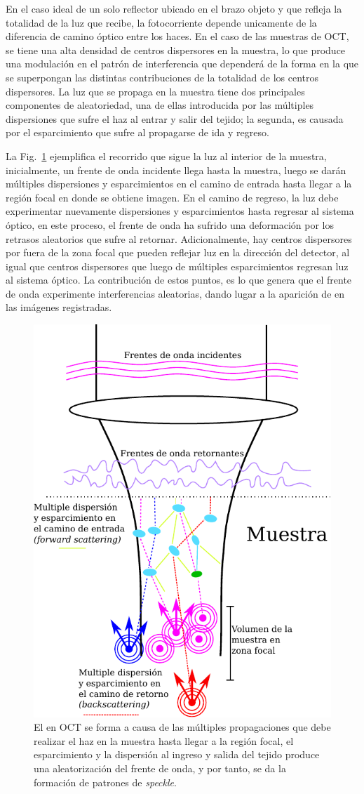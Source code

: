 En el caso ideal de un solo reflector ubicado en el brazo objeto y que refleja la totalidad de la luz que recibe, la fotocorriente depende unicamente de la diferencia de camino óptico entre los haces. En el caso de las muestras de OCT, se tiene una alta densidad de centros dispersores en la muestra, lo que produce una modulación en el patrón de interferencia que dependerá de la forma en la que se superpongan las distintas contribuciones de la totalidad de los centros dispersores. La luz que se propaga en la muestra tiene dos principales componentes de aleatoriedad, una de ellas introducida por las múltiples dispersiones que sufre el haz al entrar y salir del tejido; la segunda, es causada por el esparcimiento que sufre al propagarse de ida y regreso. 

La Fig.~\ref{fig:sample_backscattering} ejemplifica el recorrido que sigue la luz al interior de la muestra, inicialmente, un frente de onda incidente llega hasta la muestra, luego se darán múltiples dispersiones y esparcimientos en el camino de entrada hasta llegar a la región focal en donde se obtiene imagen. En el camino de regreso, la luz debe experimentar nuevamente dispersiones y esparcimientos hasta regresar al sistema óptico, en este proceso, el frente de onda ha sufrido una deformación por los retrasos aleatorios que sufre al retornar. Adicionalmente, hay centros dispersores por fuera de la zona focal que pueden reflejar luz en la dirección del detector, al igual que centros dispersores que luego de múltiples esparcimientos regresan luz al sistema óptico. La contribución de estos puntos, es lo que genera que el frente de onda experimente interferencias aleatorias, dando lugar a la aparición de \speckle en las imágenes registradas.

\begin{figure}
\centering
\includegraphics[width=0.4\linewidth]{img/chap3/sample_backscattering}
\caption[Formación del \speckle en OCT.]{El \speckle en OCT se forma a causa de las múltiples propagaciones que debe realizar el haz en la muestra hasta llegar a la región focal, el esparcimiento y la dispersión al ingreso y salida del tejido produce una aleatorización del frente de onda, y por tanto, se da la formación de patrones de \textit{speckle}.}
\label{fig:sample_backscattering}
\end{figure}


